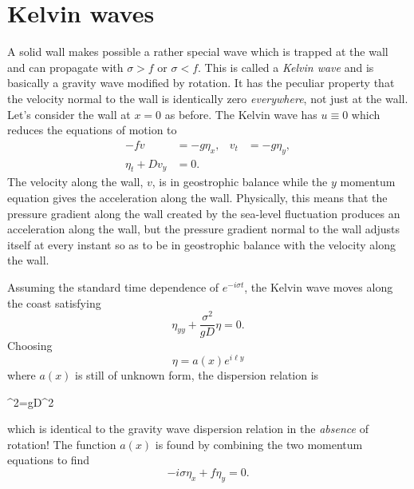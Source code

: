 
\section{Kelvin waves}

A solid wall makes possible a rather special wave which is trapped at the wall and can
propagate with $\sigma>f$ or $\sigma<f$. This is called a \emph{Kelvin wave} and is
basically a gravity wave modified by rotation. It has the peculiar property that the
velocity normal to the wall is identically zero \emph{everywhere}, not just at the wall.
Let's consider the wall at $x=0$ as before. The Kelvin wave has $u\equiv0$ which reduces
the equations of motion to
\begin{align*}
	-fv         & =-g\eta_x,
	            & v_t        & =-g\eta_y, \\
	\eta_t+Dv_y & =0.
\end{align*}
The velocity along the wall, $v$, is in geostrophic balance while the $y$ momentum
equation gives the acceleration along the wall. Physically, this means that the pressure
gradient along the wall created by the sea-level fluctuation produces an acceleration
along the wall, but the pressure gradient normal to the wall adjusts itself at every
instant so as to be in geostrophic balance with the velocity along the wall.

Assuming the standard time dependence of $e^{-i\sigma t}$, the Kelvin wave moves along
the coast satisfying
\[
	\eta_{yy}+\frac{\sigma^2}{gD}\eta=0.
\]
Choosing
\[
	\eta=a(x)e^{i\ell y}
\]
where $a(x)$ is still of unknown form, the dispersion relation is
\begin{waveequation}
	\sigma^2=gD\ell^2
\end{waveequation}
which is identical to the gravity wave dispersion relation in the \emph{absence} of
rotation! The function $a(x)$ is found by combining the two momentum equations to find
\[
	-i\sigma\eta_x+f\eta_y=0.
\]

\sourcepagebreak

